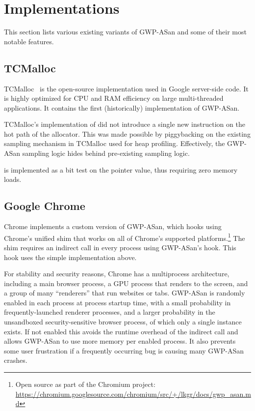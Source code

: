 \section{Implementations}
\label{sec:impls}

This section lists various existing variants of GWP-ASan and some of their most
notable features.

\subsection{TCMalloc}

TCMalloc~\cite{TCMalloc} is the open-source  implementation
used in Google server-side code. It is highly optimized for CPU and RAM
efficiency on large multi-threaded applications.  It contains the first
(historically) implementation of GWP-ASan.

TCMalloc's implementation of  did not introduce a single new
instruction on the hot path of the allocator. This was made possible by
piggybacking on the existing sampling mechanism in TCMalloc used for heap
profiling. Effectively, the GWP-ASan sampling logic hides behind
pre-existing sampling logic.

 is implemented as a bit test on the pointer value, thus
requiring zero memory loads.

\subsection{Google Chrome}
\label{sec:chrome}

Chrome implements a custom version of GWP-ASan, which hooks 
using Chrome's unified  shim that works on all of Chrome's
supported platforms.\footnote{Open source as part of the Chromium project:
\url{https://chromium.googlesource.com/chromium/src/+/lkgr/docs/gwp\_asan.md}}
The  shim requires an indirect call in every process using
GWP-ASan's hook.  This hook uses the simple 
implementation above.

For stability and security reasons, Chrome has a multiprocess architecture,
including a main browser process, a GPU process that renders to the screen, and
a group of many ``renderers'' that run websites or tabs. GWP-ASan is randomly
enabled in each process at process startup time, with a small probability in
frequently-launched renderer processes, and a larger probability in the
unsandboxed security-sensitive browser process, of which only a single instance
exists. If not enabled this avoids the runtime overhead of the indirect call
and allows GWP-ASan to use more memory per enabled process. It also prevents
some user frustration if a frequently occurring bug is causing many GWP-ASan
crashes.

